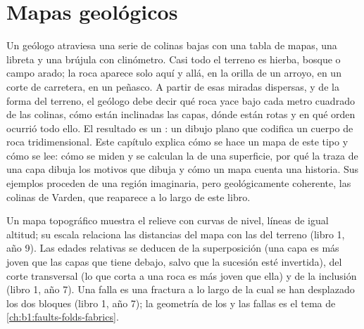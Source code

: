 \chapter{Mapas geológicos}\label{ch:b1:geological-maps}

Un geólogo atraviesa una serie de colinas bajas con una tabla de mapas, una libreta y una brújula
con clinómetro. Casi todo el terreno es hierba, bosque o campo arado; la roca aparece solo aquí y
allá, en la orilla de un arroyo, en un corte de carretera, en un peñasco. A partir de esas miradas
dispersas, y de la forma del terreno, el geólogo debe decir qué roca yace bajo cada metro cuadrado
de las colinas, cómo están inclinadas las capas, dónde están rotas y en qué orden ocurrió todo
ello. El resultado es un : un dibujo plano que codifica un cuerpo de roca
tridimensional. Este capítulo explica cómo se hace un mapa de este tipo y cómo se lee: cómo se
miden y se calculan la  de una superficie, por qué la traza de una capa dibuja los motivos
que dibuja y cómo un mapa cuenta una historia. Sus ejemplos proceden de una región imaginaria,
pero geológicamente coherente, las colinas de Varden, que reaparece a lo largo de este libro.

\begin{recall}
Un mapa topográfico muestra el relieve con curvas de nivel, líneas de igual altitud; su escala
relaciona las distancias del mapa con las del terreno (libro 1, año 9). Las edades relativas se
deducen de la superposición (una capa es más joven que las capas que tiene debajo, salvo que la
sucesión esté invertida), del corte transversal (lo que corta a una roca es más joven que ella) y
de la inclusión (libro 1, año 7). Una falla es una fractura a lo largo de la cual se han desplazado
los dos bloques (libro 1, año 7); la geometría de los  y las fallas es el tema de
\cref{ch:b1:faults-folds-fabrics}.
\end{recall}


